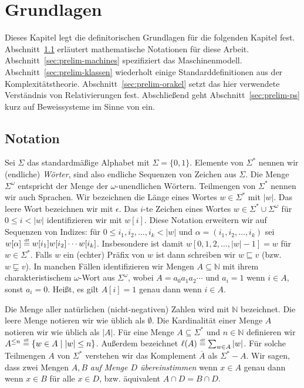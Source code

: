 \chapter{Grundlagen}\label{chap:prelim}

Dieses Kapitel legt die definitorischen Grundlagen für die folgenden Kapitel fest. Abschnitt~\ref{sec:notation} erläutert mathematische Notationen für diese Arbeit. Abschnitt~\ref{sec:prelim-machines} spezifiziert das Maschinenmodell.  Abschnitt~\ref{sec:prelim-klassen} wiederholt einige Standarddefinitionen aus der Komplexitätstheorie. Abschnitt~\ref{sec:prelim-orakel} setzt das hier verwendete Verständnis von Relativierungen fest. Abschließend geht Abschnitt~\ref{sec:prelim-ps} kurz auf Beweissysteme im Sinne von \textcite{cook_relative_1979} ein.

\section{Notation}\label{sec:notation}

Sei $\Sigma$ das standardmäßige Alphabet mit $\Sigma=\{0,1\}$. Elemente von $\Sigma^*$ nennen wir (endliche) \emph{Wörter}, sind also endliche Sequenzen von Zeichen aus $\Sigma$. Die Menge $\Sigma^\omega$ entspricht der Menge der $\omega$-unendlichen Wörtern. Teilmengen von $\Sigma^*$ nennen wir auch Sprachen. Wir bezeichnen die Länge eines Wortes $w\in\Sigma^*$ mit $|w|$. Das leere Wort bezeichnen wir mit $\epsilon$. Das $i$-te Zeichen eines Wortes $w\in\Sigma^*\cup\Sigma^\omega$ für $0\leq i< |w|$ identifizieren wir mit $w[i]$. Diese Notation erweitern wir auf Sequenzen von Indizes: für $0\leq i_1, i_2, \dots, i_k< |w|$ und $\alpha=(i_1, i_2, \dots, i_k)$ sei $w[\alpha] \stackrel{\text{\smash{\tiny df}}}{=} w[i_1]w[i_2]\cdots w[i_k]$. Insbesondere ist damit $w[0,1,2,\dots, |w|-1]= w$ für $w\in\Sigma^*$.
Falls $w$ ein (echter) Präfix von $w$ ist dann schreiben wir $w \sqsubseteq v$ (bzw. $w\sqsubsetneq v$).
In manchen Fällen identifizieren wir Mengen $A\subseteq\mathbb N$ mit ihrem charakteristischem $\omega$-Wort aus $\Sigma^\omega$, wobei $A=a_0a_1a_2\cdots$ und $a_i=1$ wenn $i\in A$, sonst $a_i=0$.
Heißt, es gilt $A[i] = 1$ genau dann wenn $i\in A$.

Die Menge aller natürlichen (nicht-negativen) Zahlen wird mit $\mathbb N$ bezeichnet. Die leere Menge notieren wir wie üblich als $\emptyset$. Die Kardinalität einer Menge $A$ notieren wir wie üblich als $|A|$. Für eine Menge $A\subseteq\Sigma^*$ und $n\in \mathbb N$ definieren wir $A^{\leq n} \stackrel{\text{\smash{\tiny df}}}{=} \{ w\in A \mid |w|\leq n\}$. 
Außerdem bezeichnet $\ell(A)\stackrel{\text{\smash{\tiny df}}}{=}\sum_{w\in A} |w|$. Für solche Teilmengen $A$ von $\Sigma^*$ verstehen wir das Komplement $\overline{A}$ als $\Sigma^*-A$.
Wir sagen, dass zwei Mengen $A, B$ \emph{auf Menge $D$ übereinstimmen} wenn $x\in A$ genau dann wenn $x\in B$ für alle $x\in D$, bzw. äquivalent $A\cap D= B\cap D$.

